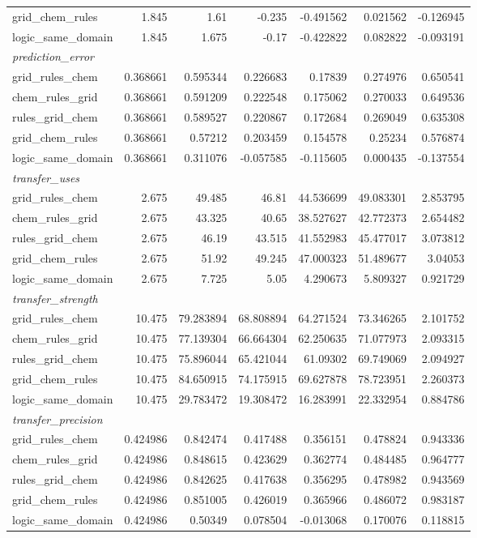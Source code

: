 \begin{tabular}{lrrrrrr}
  grid_chem_rules & 1.845 & 1.61 & -0.235 & -0.491562 & 0.021562 & -0.126945 \\
  logic_same_domain & 1.845 & 1.675 & -0.17 & -0.422822 & 0.082822 & -0.093191 \\
  \multicolumn{7}{l}{\textit{prediction_error}} \\
  grid_rules_chem & 0.368661 & 0.595344 & 0.226683 & 0.17839 & 0.274976 & 0.650541 \\
  chem_rules_grid & 0.368661 & 0.591209 & 0.222548 & 0.175062 & 0.270033 & 0.649536 \\
  rules_grid_chem & 0.368661 & 0.589527 & 0.220867 & 0.172684 & 0.269049 & 0.635308 \\
  grid_chem_rules & 0.368661 & 0.57212 & 0.203459 & 0.154578 & 0.25234 & 0.576874 \\
  logic_same_domain & 0.368661 & 0.311076 & -0.057585 & -0.115605 & 0.000435 & -0.137554 \\
  \multicolumn{7}{l}{\textit{transfer_uses}} \\
  grid_rules_chem & 2.675 & 49.485 & 46.81 & 44.536699 & 49.083301 & 2.853795 \\
  chem_rules_grid & 2.675 & 43.325 & 40.65 & 38.527627 & 42.772373 & 2.654482 \\
  rules_grid_chem & 2.675 & 46.19 & 43.515 & 41.552983 & 45.477017 & 3.073812 \\
  grid_chem_rules & 2.675 & 51.92 & 49.245 & 47.000323 & 51.489677 & 3.04053 \\
  logic_same_domain & 2.675 & 7.725 & 5.05 & 4.290673 & 5.809327 & 0.921729 \\
  \multicolumn{7}{l}{\textit{transfer_strength}} \\
  grid_rules_chem & 10.475 & 79.283894 & 68.808894 & 64.271524 & 73.346265 & 2.101752 \\
  chem_rules_grid & 10.475 & 77.139304 & 66.664304 & 62.250635 & 71.077973 & 2.093315 \\
  rules_grid_chem & 10.475 & 75.896044 & 65.421044 & 61.09302 & 69.749069 & 2.094927 \\
  grid_chem_rules & 10.475 & 84.650915 & 74.175915 & 69.627878 & 78.723951 & 2.260373 \\
  logic_same_domain & 10.475 & 29.783472 & 19.308472 & 16.283991 & 22.332954 & 0.884786 \\
  \multicolumn{7}{l}{\textit{transfer_precision}} \\
  grid_rules_chem & 0.424986 & 0.842474 & 0.417488 & 0.356151 & 0.478824 & 0.943336 \\
  chem_rules_grid & 0.424986 & 0.848615 & 0.423629 & 0.362774 & 0.484485 & 0.964777 \\
  rules_grid_chem & 0.424986 & 0.842625 & 0.417638 & 0.356295 & 0.478982 & 0.943569 \\
  grid_chem_rules & 0.424986 & 0.851005 & 0.426019 & 0.365966 & 0.486072 & 0.983187 \\
  logic_same_domain & 0.424986 & 0.50349 & 0.078504 & -0.013068 & 0.170076 & 0.118815 \\
\bottomrule
\end{tabular}